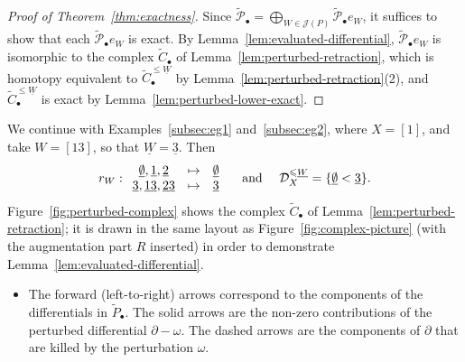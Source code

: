 \documentclass[a4paper,leqno]{amsart}
\begin{document}
\begin{proof}[Proof of Theorem~\ref{thm:exactness}]
Since $\widetilde{\mathcal P}_\bullet=\bigoplus_{W\in\mathcal J(P)}\widetilde{\mathcal P}_\bullet e_W$, it suffices to show that each $\widetilde{\mathcal P}_\bullet e_W$ is exact. By Lemma~\ref{lem:evaluated-differential}, $\widetilde{\mathcal P}_\bullet e_W$ is isomorphic to the complex $\widetilde{C}_\bullet$ of Lemma~\ref{lem:perturbed-retraction}, which is homotopy equivalent to $\widetilde{C}^{\leq\underline{W}}_\bullet$ by Lemma~\ref{lem:perturbed-retraction}\textup{(2)}, and $\widetilde{C}^{\leq\underline{W}}_\bullet$ is exact by Lemma~\ref{lem:perturbed-lower-exact}.
\end{proof}



\begin{eg}\label{eg:perturbed-lemmas} We continue with Examples~\ref{subsec:eg1} and~\ref{subsec:eg2}, where $X=[1]$, and take $W=[13]$, so that $\underline{W}=\underline{3}$. Then 
$$
r_W: \begin{array}{ccc} \underline{\emptyset},\underline{1},\underline{2} &\mapsto&  \underline{\emptyset} \\
\underline{3},\underline{13},\underline{23} &\mapsto& \underline{3} \end{array} \quad \text{ and }\quad  \mathcal D_X^{\leqslant \underline{W}} = \{\underline{\emptyset} < \underline{3}\}.
$$
Figure~\ref{fig:perturbed-complex} shows the complex $\widetilde{C}_\bullet$ of Lemma~\ref{lem:perturbed-retraction}; it is drawn in the same layout as Figure~\ref{fig:complex-picture} (with the augmentation part $R$ inserted) in order to demonstrate Lemma~\ref{lem:evaluated-differential}.
\begin{itemize}
 \item The forward (left-to-right) arrows correspond to the components of the differentials in $\widetilde{P}_\bullet$.  The solid arrows are the non-zero contributions of the perturbed differential $\partial-\omega$. The dashed arrows are the components of $\partial$ that are killed by the perturbation $\omega$.
 

\end{itemize}
\end{eg}
\end{document}
